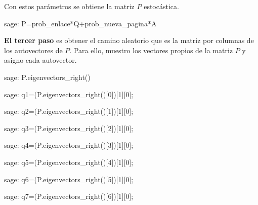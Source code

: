 \par Con estos parámetros se obtiene la matriz $P$ estocástica.
\begin{sagecommandline}
    sage: P=prob_enlace*Q+prob_nueva_pagina*A
\end{sagecommandline}
\par \textbf{El tercer paso} es obtener el camino aleatorio que es la matriz por columnas de los autovectores de $P$.
Para ello, muestro los vectores propios de la matriz $P$ y asigno cada autovector.
\begin{sagecommandline}[\textwidth]
    sage: P.eigenvectors_right()
\end{sagecommandline}
   
\begin{sagecommandline}
    sage: q1=(P.eigenvectors_right()[0])[1][0];
\end{sagecommandline}

\begin{sagecommandline}
    sage: q2=(P.eigenvectors_right()[1])[1][0];
\end{sagecommandline}

\begin{sagecommandline}
    sage: q3=(P.eigenvectors_right()[2])[1][0];
\end{sagecommandline}

\begin{sagecommandline}
    sage: q4=(P.eigenvectors_right()[3])[1][0];
\end{sagecommandline}

\begin{sagecommandline}
    sage: q5=(P.eigenvectors_right()[4])[1][0];
\end{sagecommandline}

\begin{sagecommandline}
    sage: q6=(P.eigenvectors_right()[5])[1][0];
\end{sagecommandline}

\begin{sagecommandline}
    sage: q7=(P.eigenvectors_right()[6])[1][0];
\end{sagecommandline}

